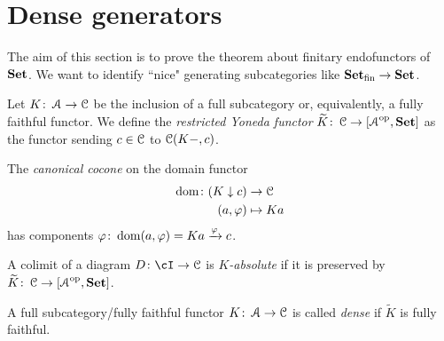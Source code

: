 \documentclass[a4paper,11pt,oneside,openany]{scrbook}
\begin{document}
\section{Dense generators}
The aim of this section is to prove the theorem about finitary endofunctors of ${\normalfont\textbf{Set}}$. We want to identify ``nice" generating subcategories like ${\normalfont\textbf{Set}}_\text{fin}\to{\normalfont\textbf{Set}}$.
\begin{defn}
	Let $K\colon\operatorname{\mathcal{A}}\to\operatorname{\mathcal{C}}$ be the inclusion of a full subcategory or, equivalently, a fully faithful functor. We define the \emph{restricted Yoneda functor} $\widetilde{K}\colon\operatorname{\mathcal{C}}\to\left[\operatorname{\mathcal{A}}^{\operatorname{\text{op}}},{\normalfont\textbf{Set}}\right]$ as the functor sending $c\in\operatorname{\mathcal{C}}$ to $\operatorname{\mathcal{C}}(K-,c)$.
\end{defn}
The \emph{canonical cocone} on the domain functor
\begin{align*}
\operatorname{dom}\colon(K\downarrow c)&\to\operatorname{\mathcal{C}}\\
(a,\varphi)&\mapsto Ka
\end{align*}
has components $\varphi\colon\operatorname{dom}(a,\varphi)=Ka\xrightarrow{\varphi}c$.
\begin{defn}
	A colimit of a diagram $D\colon\cI\to\C$ is \emph{$K$-absolute} if it is preserved by $\widetilde{K}\colon\operatorname{\mathcal{C}}\to\left[\operatorname{\mathcal{A}}^{\operatorname{\text{op}}},{\normalfont\textbf{Set}}\right]$.
\end{defn}
	\begin{defn}
		A full subcategory/fully faithful functor $K\colon\operatorname{\mathcal{A}}\to\operatorname{\mathcal{C}}$ is called \emph{dense} if $\widetilde{K}$ is fully faithful.
	\end{defn}
\end{document}
